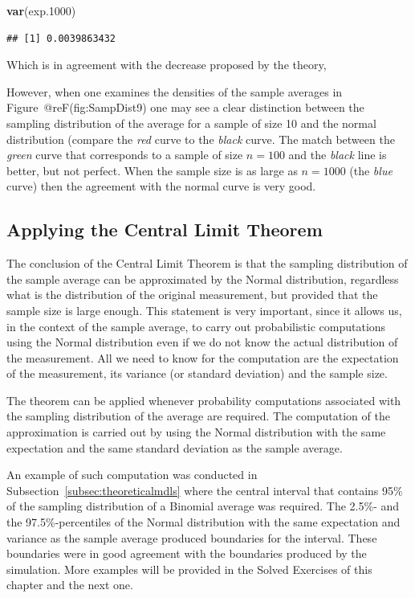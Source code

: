\documentclass[]{krantz}
\makeatletter
\newenvironment{Shaded}{\begin{snugshade}}{\end{snugshade}}
\newcommand{\FloatTok}[1]{\textcolor[rgb]{0.00,0.00,0.81}{#1}}
\newcommand{\KeywordTok}[1]{\textcolor[rgb]{0.13,0.29,0.53}{\textbf{#1}}}
\newcommand{\NormalTok}[1]{#1}
\newenvironment{kframe}{%
\medskip{}
\setlength{\fboxsep}{.8em}
 \def\at@end@of@kframe{}%
 \ifinner\ifhmode%
  \def\at@end@of@kframe{\end{minipage}}%
  \begin{minipage}{\columnwidth}%
 \fi\fi%
 \def\FrameCommand##1{\hskip\@totalleftmargin \hskip-\fboxsep
 \colorbox{shadecolor}{##1}\hskip-\fboxsep
     \hskip-\linewidth \hskip-\@totalleftmargin \hskip\columnwidth}%
 \MakeFramed {\advance\hsize-\width
   \@totalleftmargin\z@ \linewidth\hsize
   \@setminipage}}%
 {\par\unskip\endMakeFramed%
 \at@end@of@kframe}
\renewenvironment{Shaded}{\begin{kframe}}{\end{kframe}}
\theoremstyle{definition}
\theoremstyle{definition}
\theoremstyle{definition}
\theoremstyle{remark}
\makeatother
\begin{document}
\begin{Shaded}
\begin{Highlighting}[]
\KeywordTok{var}\NormalTok{(exp}\FloatTok{.1000}\NormalTok{)}
\end{Highlighting}
\end{Shaded}

\begin{verbatim}
## [1] 0.0039863432
\end{verbatim}

Which is in agreement with the decrease proposed by the theory,

However, when one examines the densities of the sample averages in
Figure~@reF(fig:SampDist9) one may see a clear distinction between the
sampling distribution of the average for a sample of size 10 and the
normal distribution (compare the \emph{red} curve to the \emph{black} curve. The
match between the \emph{green} curve that corresponds to a sample of size
\(n=100\) and the \emph{black} line is better, but not perfect. When the sample
size is as large as \(n=1000\) (the \emph{blue} curve) then the agreement with
the normal curve is very good.

\hypertarget{applying-the-central-limit-theorem}{%
\subsection{Applying the Central Limit Theorem}\label{applying-the-central-limit-theorem}}

The conclusion of the Central Limit Theorem is that the sampling
distribution of the sample average can be approximated by the Normal
distribution, regardless what is the distribution of the original
measurement, but provided that the sample size is large enough. This
statement is very important, since it allows us, in the context of the
sample average, to carry out probabilistic computations using the Normal
distribution even if we do not know the actual distribution of the
measurement. All we need to know for the computation are the expectation
of the measurement, its variance (or standard deviation) and the sample
size.

The theorem can be applied whenever probability computations associated
with the sampling distribution of the average are required. The
computation of the approximation is carried out by using the Normal
distribution with the same expectation and the same standard deviation
as the sample average.

An example of such computation was conducted in
Subsection~\ref{subsec:theoreticalmdls} where the central interval that
contains 95\% of the sampling distribution of a Binomial average was
required. The 2.5\%- and the 97.5\%-percentiles of the Normal distribution
with the same expectation and variance as the sample average produced
boundaries for the interval. These boundaries were in good agreement
with the boundaries produced by the simulation. More examples will be
provided in the Solved Exercises of this chapter and the next one.
\end{document}
